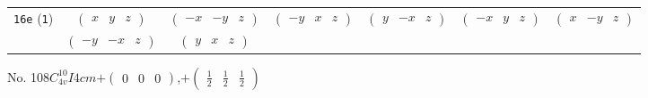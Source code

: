 \documentclass[fleqn,9pt,landscape]{jsarticle}
\begin{document}
\begin{center}
\begin{longtable}{ccccccc}
{\tt 16e} ({\tt 1}) & $ \begin{pmatrix} x & y & z \end{pmatrix} $ & $ \begin{pmatrix} - x & - y & z \end{pmatrix} $ & $ \begin{pmatrix} - y & x & z \end{pmatrix} $ & $ \begin{pmatrix} y & - x & z \end{pmatrix} $ & $ \begin{pmatrix} - x & y & z \end{pmatrix} $ & $ \begin{pmatrix} x & - y & z \end{pmatrix} $ \\
& $ \begin{pmatrix} - y & - x & z \end{pmatrix} $ & $ \begin{pmatrix} y & x & z \end{pmatrix} $ & $  $ & $  $ & $  $ & $  $ \\
\end{longtable}
\end{center}
\newpage
No. 108\quad$C_{4v}^{10}$\quad$I4cm$\quad[ tetragonal ]\quad$+\begin{pmatrix} 0 & 0 & 0 \end{pmatrix}$,\quad $+\begin{pmatrix} \frac{1}{2} & \frac{1}{2} & \frac{1}{2} \end{pmatrix}$
\end{document}

